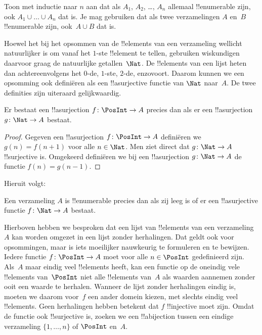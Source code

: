 \documentclass[../../../include/open-logic-section]{subfiles}
\begin{document}
\begin{prob}
  Toon met inductie naar $n$ aan dat als $A_1$, $A_2$, \dots, $A_n$
  allemaal !!{enumerable} zijn, ook $A_1 \cup \dots \cup A_n$ dat is.
  Je mag gebruiken dat als twee verzamelingen $A$ en~$B$ !!{enumerable}
  zijn, ook~$A \cup B$ dat is. 
\end{prob}

Hoewel het bij het opsommen van de !!{element}s van een verzameling
wellicht natuurlijker is om vanaf het $1$-ste !!{element} te tellen,
gebruiken wiskundigen daarvoor graag de natuurlijke getallen~$\Nat$.
De !!{element}s van een lijst heten dan achtereenvolgens het $0$-de,
$1$-ste, $2$-de, enzovoort. Daarom kunnen we een
opsomming ook definiëren als een !!a{surjective} functie van $\Nat$
naar~$A$. De twee definities zijn uiteraard gelijkwaardig.

\begin{prop}
  Er bestaat een !!a{surjection} $f\colon \PosInt \to A$ precies dan
  als er een !!a{surjection} $g\colon \Nat \to A$ bestaat.
\end{prop}

\begin{proof}
  Gegeven een !!a{surjection} $f\colon \PosInt \to A$ definiëren we
  $g(n) = f(n+1)$ voor alle $n \in \Nat$. Men ziet direct dat
  $g\colon \Nat \to A$ !!{surjective} is. Omgekeerd definiëren we bij
  een !!a{surjection} $g\colon \Nat \to A$ de functie
  $f(n) = g(n-1)$.
\end{proof}

Hieruit volgt:

\begin{cor}
Een verzameling $A$ is !!{enumerable} precies dan als zij leeg is of er
een !!a{surjective} functie $f\colon \Nat \to A$ bestaat.
\end{cor}

Hierboven hebben we besproken dat een lijst van !!{element}s van een
verzameling~$A$ kan worden omgezet in een lijst zonder herhalingen. Dat
geldt ook voor opsommingen, maar is iets moeilijker nauwkeurig te
formuleren en te bewijzen. Iedere functie $f\colon \PosInt \to A$ moet
voor alle $n \in \PosInt$ gedefinieerd zijn. Als~$A$ maar eindig veel
!!{element}s heeft, kan een functie op de oneindig vele !!{element}s
van~$\PosInt$ niet alle !!{element}s van~$A$ als waarden aannemen zonder
ooit een waarde te herhalen. Wanneer de lijst zonder herhalingen eindig
is, moeten we daarom voor~$f$ een ander domein kiezen, met slechts eindig
veel !!{element}s. Geen herhalingen hebben betekent dat $f$
!!{injective} moet zijn. Omdat de functie ook !!{surjective} is, zoeken
we een !!a{bijection} tussen een eindige verzameling $\{1, \dots, n\}$
of $\PosInt$ en~$A$.
\end{document}
